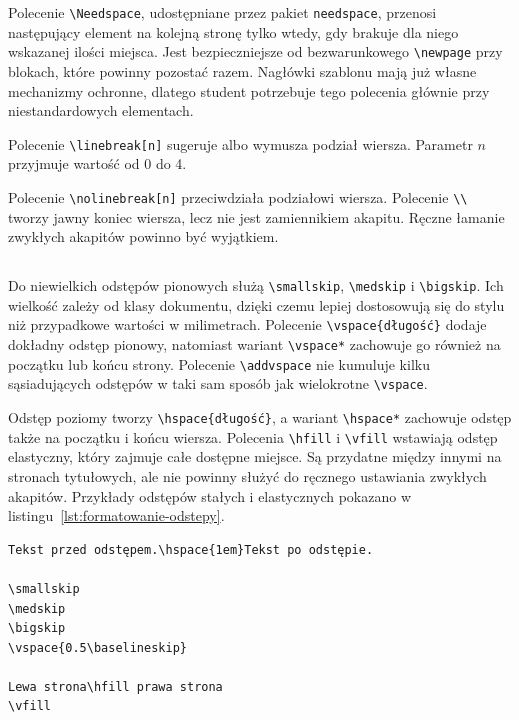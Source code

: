 Polecenie \verb|\Needspace|, udostępniane przez pakiet \texttt{needspace}, przenosi następujący element na kolejną stronę tylko wtedy, gdy brakuje dla niego wskazanej ilości miejsca. Jest bezpieczniejsze od bezwarunkowego \verb|\newpage| przy blokach, które powinny pozostać razem. Nagłówki szablonu mają już własne mechanizmy ochronne, dlatego student potrzebuje tego polecenia głównie przy niestandardowych elementach.

Polecenie \verb|\linebreak[n]| sugeruje albo wymusza podział wiersza. Parametr $n$ przyjmuje wartość od 0 do 4.

Polecenie \verb|\nolinebreak[n]| przeciwdziała podziałowi wiersza. Polecenie \verb|\\| tworzy jawny koniec wiersza, lecz nie jest zamiennikiem akapitu. Ręczne łamanie zwykłych akapitów powinno być wyjątkiem.

\subsection{}

Do niewielkich odstępów pionowych służą \verb|\smallskip|, \verb|\medskip| i \verb|\bigskip|. Ich wielkość zależy od klasy dokumentu, dzięki czemu lepiej dostosowują się do stylu niż przypadkowe wartości w milimetrach. Polecenie \verb|\vspace{długość}| dodaje dokładny odstęp pionowy, natomiast wariant \verb|\vspace*| zachowuje go również na początku lub końcu strony. Polecenie \verb|\addvspace| nie kumuluje kilku sąsiadujących odstępów w taki sam sposób jak wielokrotne \verb|\vspace|.

Odstęp poziomy tworzy \verb|\hspace{długość}|, a wariant \verb|\hspace*| zachowuje odstęp także na początku i końcu wiersza. Polecenia \verb|\hfill| i \verb|\vfill| wstawiają odstęp elastyczny, który zajmuje całe dostępne miejsce. Są przydatne między innymi na stronach tytułowych, ale nie powinny służyć do ręcznego ustawiania zwykłych akapitów. Przykłady odstępów stałych i elastycznych pokazano w listingu~\ref{lst:formatowanie-odstepy}.

\begin{lstlisting}[style=thesis,caption={Odstępy stałe, względne i elastyczne},label={lst:formatowanie-odstepy}]
Tekst przed odstępem.\hspace{1em}Tekst po odstępie.

\smallskip
\medskip
\bigskip
\vspace{0.5\baselineskip}

Lewa strona\hfill prawa strona
\vfill
\end{lstlisting}

